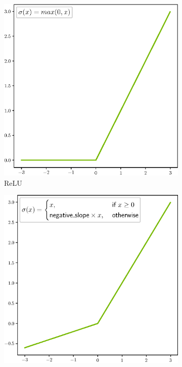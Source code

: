 \begin{figure}[H]
    \centering
    \begin{subfigure}[b]{0.3\textwidth}
        \centering
        \includegraphics[width=\textwidth]{resources/images/ReLU.eps}
        \caption{ReLU\footnotemark}
        \label{fig:relu}
    \end{subfigure}
    \hfill
    \begin{subfigure}[b]{0.3\textwidth}
        \centering
        \includegraphics[width=\textwidth]{resources/images/LReLU.eps}

\end{subfigure}
\end{figure}
